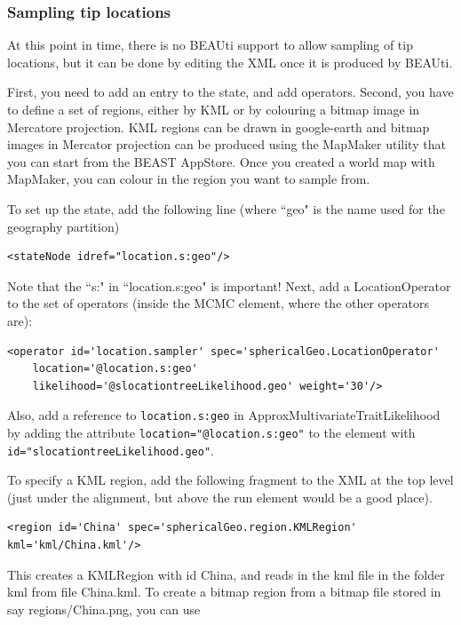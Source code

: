 \documentclass{article}
\begin{document}
\subsubsection*{Sampling tip locations}
At this point in time, there is no BEAUti support to allow sampling of tip locations, but it can be done by editing the XML once it is produced by BEAUti.

First, you need to add an entry to the state, and add operators.
Second, you have to define a set of regions, either by KML or by colouring a bitmap image in Mercatore projection. KML regions can be drawn in google-earth and bitmap images in Mercator projection can be produced using the MapMaker utility that you can start from the BEAST AppStore. Once you created a world map with MapMaker, you can colour in the region you want to sample from.

To set up the state, add the following line (where ``geo" is the name used for the geography partition)

\begin{verbatim}
<stateNode idref="location.s:geo"/>
\end{verbatim}

Note that the ``s:" in ``location.s:geo" is important!
Next, add a LocationOperator to the set of operators (inside the MCMC element, where the other operators are):

\begin{verbatim}
<operator id='location.sampler' spec='sphericalGeo.LocationOperator' 
    location='@location.s:geo' 
    likelihood='@slocationtreeLikelihood.geo' weight='30'/>
\end{verbatim}

Also, add a reference to {\tt location.s:geo} in ApproxMultivariateTraitLikelihood by adding the attribute {\tt location="@location.s:geo"} to the element with {\tt id="slocationtreeLikelihood.geo"}.

To specify a KML region, add the following fragment to the XML at the top level (just under the alignment, but above the run element would be a good place).

\begin{verbatim}
<region id='China' spec='sphericalGeo.region.KMLRegion' kml='kml/China.kml'/>
\end{verbatim}

This creates a KMLRegion with id China, and reads in the kml file in the folder kml from file China.kml. To create a bitmap region from a bitmap file stored in say regions/China.png, you can use
\end{document}
